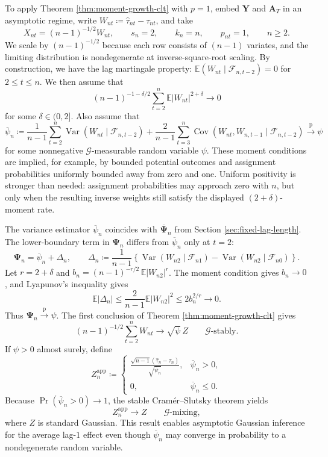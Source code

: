 \documentclass[11pt]{article}
\renewcommand\vec[1]{\boldsymbol{#1}}
\newcommand\mat[1]{\mathbf{#1}}
\DeclareMathOperator{\Cov}{Cov}
\DeclareMathOperator{\Var}{Var}
\newcommand{\E}{\mathbb{E}}
\newcommand{\G}{\mathcal{G}}
\newcommand{\F}{\mathcal{F}}
\newcommand{\pconverge}{\overset{\mathrm{p}}{\to}}
\theoremstyle{definition}
\begin{document}
To apply Theorem \ref{thm:moment-growth-clt} with \(p=1\), embed $\mat{Y}$ and $\vec{A}_T$ in an asymptotic regime, write \(W_{nt}\coloneqq\hat\tau_{nt}-\tau_{nt}\), and take
\[
X_{nt}=(n-1)^{-1/2}W_{nt},\qquad s_n=2,\qquad k_n=n,\qquad p_{nt}=1,\qquad n \geq 2.
\]
We scale by $(n-1)^{-1/2}$ because each row consists of $(n-1)$ variates, and the limiting distribution is nondegenerate at inverse-square-root scaling.
By construction, we have the lag martingale property: $\E(W_{nt}\mid\F_{n,t-2})=0$ for $2\leq t\leq n$.
We then assume that
\[
(n-1)^{-1-\delta/2}\sum_{t=2}^{n}\E|W_{nt}|^{2+\delta}\to0
\]
for some $\delta\in(0,2]$.
Also assume that
\begin{equation}\label{eq:psi-n-app}
\overline{\psi}_n
\coloneqq
\frac{1}{n-1}\sum_{t=2}^{n}\Var(W_{nt}\mid\F_{n,t-2})
+
\frac{2}{n-1}\sum_{t=3}^{n}\Cov(W_{nt},W_{n,t-1}\mid\F_{n,t-2})
\pconverge\psi
\end{equation}
for some nonnegative $\G$-measurable random variable $\psi$.
These moment conditions are implied, for example, by bounded potential outcomes and assignment probabilities uniformly bounded away from zero and one.
Uniform positivity is stronger than needed: assignment probabilities may approach zero with \(n\), but only when the resulting inverse weights still satisfy the displayed \((2+\delta)\)-moment rate.

The variance estimator $\overline{\psi}_n$ coincides with $\overline{\mat{\Psi}}_n$ from Section \ref{sec:fixed-lag-length}.
The lower-boundary term in \(\mat{\Psi}_n\) differs from $\overline{\psi}_n$ only at \(t=2\):
\[
\mat{\Psi}_n=\overline{\psi}_n+\Delta_n,
\qquad
\Delta_n
\coloneqq
\frac{1}{n-1}\left\{
\Var(W_{n2}\mid\F_{n1})-\Var(W_{n2}\mid\F_{n0})
\right\}.
\]
Let \(r=2+\delta\) and \(b_n=(n-1)^{-r/2}\, \E|W_{n2}|^r\).
The moment condition gives \(b_n\to0\), and Lyapunov's inequality gives
\[
\E|\Delta_n|
\leq
\frac{2}{n-1}\E|W_{n2}|^2
\leq
2b_n^{2/r}
\to0.
\]
Thus \(\mat{\Psi}_n\pconverge\psi\).
The first conclusion of Theorem \ref{thm:moment-growth-clt} gives
\[
(n-1)^{-1/2}\sum_{t=2}^{n}W_{nt}
\to
\sqrt{\psi}\,Z
\qquad \G\text{-stably}.
\]
If \(\psi>0\) almost surely, define
\[
Z_n^{\mathrm{app}}
\coloneqq
\begin{cases}
\displaystyle
\frac{\sqrt{n-1}(\hat\tau_n-\tau_n)}{\sqrt{\overline{\psi}_n}},
&\overline{\psi}_n>0,\\[3mm]
0,&\overline{\psi}_n\leq0.
\end{cases}
\]
Because \(\Pr(\overline{\psi}_n>0)\to1\), the stable Cram\'er--Slutsky theorem yields
\begin{equation}\label{eq:mixing}
Z_n^{\mathrm{app}}\to Z
\qquad \G\text{-mixing},
\end{equation}
where \(Z\) is standard Gaussian.
This result enables asymptotic Gaussian inference for the average lag-$1$ effect even though \(\overline{\psi}_n\) may converge in probability to a nondegenerate random variable.
\end{document}
